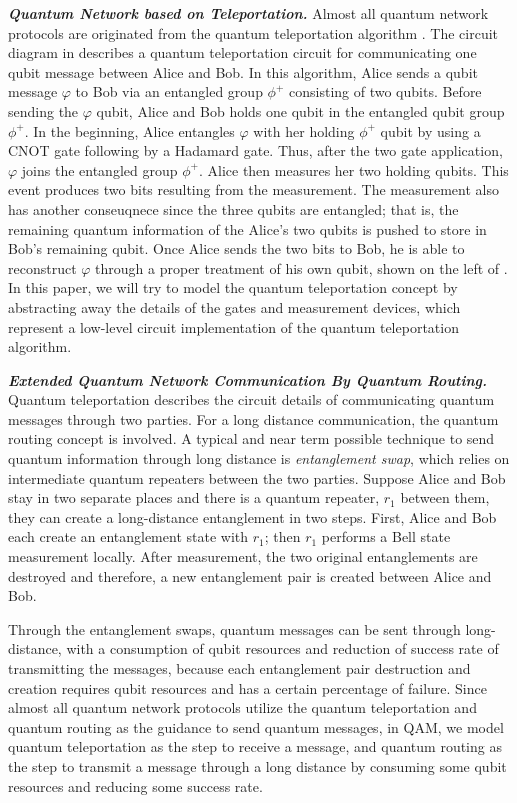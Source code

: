 \noindent\textbf{\textit{Quantum Network based on Teleportation.}}
Almost all quantum network protocols are originated from the quantum teleportation algorithm \cite{PhysRevLett.70.1895}.
The circuit diagram in  describes a quantum teleportation circuit for communicating one qubit message between Alice and Bob.
In this algorithm, Alice sends a qubit message $\varphi$ to Bob via an entangled group $\phi^{+}$ consisting of two qubits.
Before sending the $\varphi$ qubit, Alice and Bob holds one qubit in the entangled qubit group $\phi^{+}$.
In the beginning, Alice entangles $\varphi$ with her holding $\phi^{+}$ qubit by using a CNOT gate following by a Hadamard gate.
Thus, after the two gate application, $\varphi$ joins the entangled group $\phi^{+}$.
Alice then measures her two holding qubits. This event produces two bits resulting from the measurement.
The measurement also has another conseuqnece since the three qubits are entangled;
that is, the remaining quantum information of the Alice's two qubits is pushed to store in Bob's remaining qubit.
Once Alice sends the two bits to Bob, he is able to reconstruct $\varphi$ through a proper treatment of his own qubit,
shown on the left of .
In this paper, we will try to model the quantum teleportation concept
by abstracting away the details of the gates and measurement devices,
which represent a low-level circuit implementation of the quantum teleportation algorithm.

\noindent\textbf{\textit{Extended Quantum Network Communication By Quantum Routing.}}
Quantum teleportation describes the circuit details of communicating quantum messages through two parties.
For a long distance communication, the quantum routing concept is involved.
A typical and near term possible technique to send quantum information through long distance is \textit{entanglement swap},
which relies on intermediate quantum repeaters between the two parties. Suppose Alice and Bob stay in two separate places and there is a quantum repeater, $r_1$ between them, they can create a long-distance entanglement in two steps. First, Alice and Bob each create an entanglement state with $r_1$; then $r_1$ performs a Bell state measurement locally. After measurement, the two original entanglements are destroyed and therefore, a new entanglement pair is created between Alice and Bob. 

Through the entanglement swaps, quantum messages can be sent through long-distance, with a consumption of qubit resources and reduction of success rate of transmitting the messages, because each entanglement pair destruction and creation requires qubit resources and has a certain percentage of failure. 
Since almost all quantum network protocols utilize the quantum teleportation and quantum routing as the guidance to send quantum messages, in QAM, we model quantum teleportation as the step to receive a message, and quantum routing as the step to transmit a message through a long distance by consuming some qubit resources and reducing some success rate.

